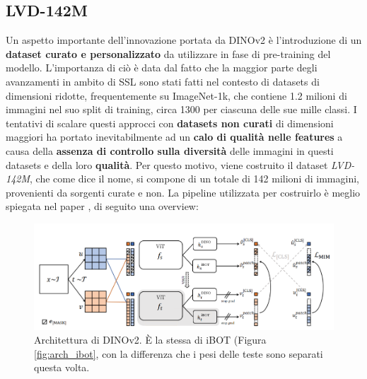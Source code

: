 \subsection{LVD-142M}
\label{LVD}
Un aspetto importante dell'innovazione portata da DINOv2 è l'introduzione di un \textbf{dataset curato e personalizzato} da utilizzare in fase di pre-training del modello. L'importanza di ciò è data dal fatto che la maggior parte degli avanzamenti in ambito di SSL sono stati fatti nel contesto di datasets di dimensioni ridotte, frequentemente su ImageNet-1k, che contiene 1.2 milioni di immagini nel suo split di training, circa 1300 per ciascuna delle sue mille classi. I tentativi di scalare questi approcci con \textbf{datasets non curati} di dimensioni maggiori ha portato inevitabilmente ad un \textbf{calo di qualità nelle features} a causa della \textbf{assenza di controllo sulla diversità} delle immagini in questi datasets e della loro \textbf{qualità}. Per questo motivo, viene costruito il dataset \textit{LVD-142M}, che come dice il nome, si compone di un totale di 142 milioni di immagini, provenienti da sorgenti curate e non. La pipeline utilizzata per costruirlo è meglio spiegata nel paper \cite{dinov2}, di seguito una overview:
\begin{figure}[b]
    \centering
    \includegraphics[width=\textwidth]{Immagini/ssl/arch_dinov2.png}
    \caption{Architettura di DINOv2. È la stessa di iBOT (Figura \ref{fig:arch_ibot}, con la differenza che i pesi delle teste sono separati questa volta.}
    \label{fig:arch_dinov2}
\end{figure}\textbf{}
